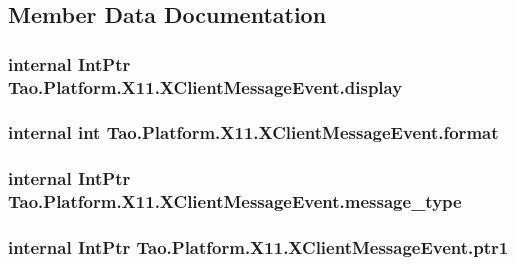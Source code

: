 \subsection{Member Data Documentation}
\hypertarget{struct_tao_1_1_platform_1_1_x11_1_1_x_client_message_event_aa5de46adf03bfa20499dfb28f7d791f3}{
\subsubsection[{display}]{\setlength{\rightskip}{0pt plus 5cm}internal IntPtr {\bf Tao.Platform.X11.XClientMessageEvent.display}}}
\label{struct_tao_1_1_platform_1_1_x11_1_1_x_client_message_event_aa5de46adf03bfa20499dfb28f7d791f3}
\hypertarget{struct_tao_1_1_platform_1_1_x11_1_1_x_client_message_event_ac3856d6e8477dd2e994bd45b042b5c06}{
\subsubsection[{format}]{\setlength{\rightskip}{0pt plus 5cm}internal int {\bf Tao.Platform.X11.XClientMessageEvent.format}}}
\label{struct_tao_1_1_platform_1_1_x11_1_1_x_client_message_event_ac3856d6e8477dd2e994bd45b042b5c06}
\hypertarget{struct_tao_1_1_platform_1_1_x11_1_1_x_client_message_event_a6ff617f0a591e889d753cb4d81fb42e8}{
\subsubsection[{message\_\-type}]{\setlength{\rightskip}{0pt plus 5cm}internal IntPtr {\bf Tao.Platform.X11.XClientMessageEvent.message\_\-type}}}
\label{struct_tao_1_1_platform_1_1_x11_1_1_x_client_message_event_a6ff617f0a591e889d753cb4d81fb42e8}
\hypertarget{struct_tao_1_1_platform_1_1_x11_1_1_x_client_message_event_ae9d24e76ce284024740963c3a96cd66f}{
\subsubsection[{ptr1}]{\setlength{\rightskip}{0pt plus 5cm}internal IntPtr {\bf Tao.Platform.X11.XClientMessageEvent.ptr1}}}
